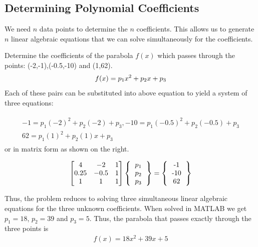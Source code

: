 \documentclass[book.tex]{subfiles}
\begin{document}
\subsection{Determining Polynomial Coefficients}
We need $n$ data points to determine the $n$ coefficients. This allows us to generate $n$ linear algebraic equations that we can solve simultaneously for the
coefficients.\\
\begin{example}
Determine the coefficients of the parabola $f(x)$ which passes through the points: (-2,-1),(-0.5,-10) and (1,62).
\begin{align}
f(x) = p_1x^2 + p_2x + p_3
\vspace{-8pt}
\end{align}
Each of these pairs can be substituted into above equation to yield a system of three equations:

\begin{align}
\begin{gathered}
-1 = p_1(-2)^2 + p_2(-2) + p_3, -10 = p_1(-0.5)^2 + p_2(-0.5) + p_3\\
62 = p_1(1)^2 + p_2(1)x + p_3
\end{gathered}
\end{align}
or in matrix form as shown on the right.
\begin{marginfigure}
\begin{align}
\begin{bmatrix}
4 & -2 & 1 \\ 
0.25 & -0.5 & 1 \\ 
1 & 1 & 1 
\end{bmatrix}
\left \{
\begin{tabular}{c}
$p_1$ \\
$p_2$ \\
$p_3$ 
\end{tabular}
\right \}
=
\left \{
\begin{tabular}{c}
-1 \\
-10 \\
62 
\end{tabular}
\right \}
\end{align}
\end{marginfigure}
Thus, the problem reduces to solving three simultaneous linear algebraic equations for the three unknown coefficients. When solved in MATLAB we get $p_1 = 18$, $p_2 = 39$ and $p_3 = 5$. Thus, the parabola that passes exactly through the three points is
\begin{align}
f(x) = 18x^2 + 39x + 5
\end{align}

\end{example}
\end{document}
